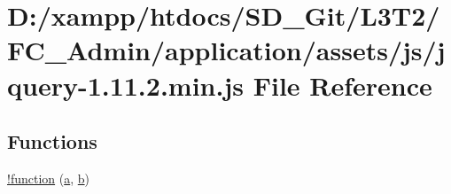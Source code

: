 \hypertarget{_admin_2application_2assets_2js_2jquery-1_811_82_8min_8js}{}\section{D\+:/xampp/htdocs/\+S\+D\+\_\+\+Git/\+L3\+T2/\+F\+C\+\_\+\+Admin/application/assets/js/jquery-\/1.11.2.min.\+js File Reference}
\label{_admin_2application_2assets_2js_2jquery-1_811_82_8min_8js}
\subsection*{Functions}
\begin{DoxyCompactItemize}
\item 
\hyperlink{_admin_2application_2assets_2js_2jquery-1_811_82_8min_8js_a43f0b96ea8ec44ca20ba86809a785614}{!function} (\hyperlink{_admin_2assets_2js_2bootstrap_8min_8js_a1f5870dcf487187f13d5fd328ed9e6e7}{a}, \hyperlink{_admin_2assets_2js_2bootstrap_8min_8js_a398bb8542498d1b14178b02b99df309b}{b})
\item 

\end{DoxyCompactItemize}
